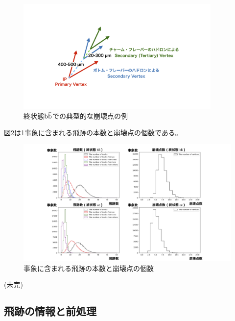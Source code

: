 \begin{figure}[htbp]
 \centering
 \includegraphics[trim = 200 150 200 150, width=0.9\textwidth, clip]{Figure/3Networks/3-1-1-1FinalStateBB.png}
 \caption{終状態$\rm b\bar{b}$での典型的な崩壊点の例}
 \label{3-1-1-1FinalStateBB}
\end{figure}

図\ref{3-1-1-2TracksandVertices}は1事象に含まれる飛跡の本数と崩壊点の個数である。

\begin{figure}[htbp]
 \centering
 \includegraphics[trim = 150 0 150 0, width=1.0\textwidth, clip]{Figure/3Networks/3-1-1-2TracksandVertices.png}
 \caption{事象に含まれる飛跡の本数と崩壊点の個数}
 \label{3-1-1-2TracksandVertices}
\end{figure}


(未完)

\subsection{飛跡の情報と前処理} \label{Net:Data:TrackInformationandPreprocessing}


